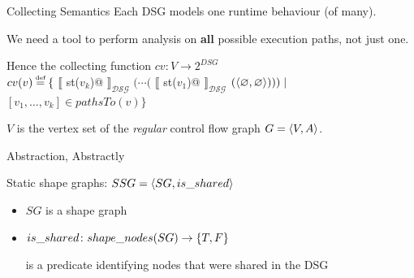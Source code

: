 \documentclass[xcolor={usenames,dvipsnames}]{beamer}
\makeatletter
\renewcommand{\emph}[1]{\alert{#1}}
\newcommand\defeq{\stackrel{\mathclap{\tiny\mbox{def}}}{=}}
\newcommand{\transformer}[2]{$\llbracket$ \lstinline@#1@
  $\rrbracket_{\mathcal{#2}}$}
\newcommand{\transformerDSG}[1]{\transformer{#1}{DSG}}
\makeatother
\begin{document}
\begin{frame}[fragile]{Collecting Semantics}
  Each DSG models one runtime behaviour (of many).

  \vspace{1em}

  We need a tool to perform analysis on \textbf{all} possible execution paths, not just one.

  \vspace{2em}

  Hence the collecting function $cv: V \to 2^{DSG}$ \\
  $cv(v) \defeq \{ $ \transformerDSG{st($v_k$)} $ ( \cdots ( $ \transformerDSG{st($v_1$)} $ ( \langle \varnothing, \varnothing \rangle ))) \mid $ \\
  \hspace{16em} $ \left[ v_1, \ldots, v_k \right] \in pathsTo(v) \} $

  \vspace{2em}

  $V$ is the vertex set of the \textit{regular} control flow graph $G = \langle V, A \rangle$.
\end{frame}


\begin{frame}{Abstraction, Abstractly}
  \vspace{-0.5em}
  \begin{center}
  \end{center}
  \pause\pause\pause

  \emph{Static shape graphs:} $SSG = \langle SG, is\_shared \rangle $
  \begin{itemize}
  \item $SG$ is a shape graph
  \item $is\_shared\colon shape\_nodes(SG) \to \set{T, F}$

    is a predicate identifying nodes that were shared in the DSG
  \end{itemize}
\end{frame}
\end{document}
